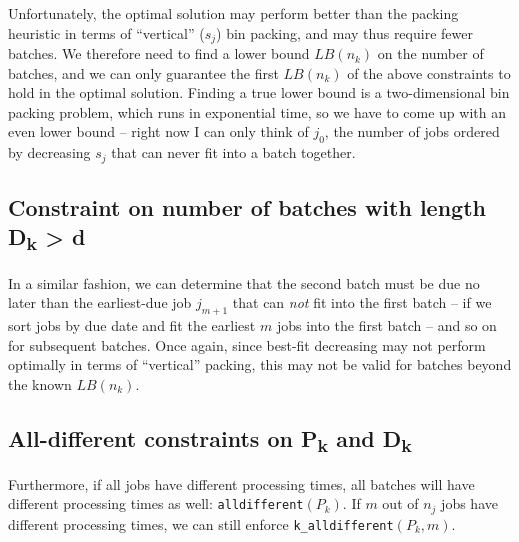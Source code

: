 Unfortunately, the optimal solution may perform better than the packing heuristic in
terms of ``vertical'' ($s_j$) bin packing, and may thus require fewer batches.
We therefore need to find a lower bound $LB(n_k)$ on the number of batches, and
we can only guarantee the first $LB(n_k)$ of the above constraints to hold in
the optimal solution. Finding a true lower bound is a two-dimensional bin
packing problem, which runs in exponential time, so we
have to come up with an even lower bound -- right now I can only think of $j_0$,
the number of jobs ordered by decreasing $s_j$ that can never fit into a batch
together.

\subsection[Constraint on the number of batches with due date $D_k >
d$]{Constraint on number of batches with length {\sansitalicfont
D\textsubscript{k}} > {\sansitalicfont d}}

In a similar fashion, we can determine that the second batch must be due no
later than the earliest-due job $j_{m+1}$ that can \textit{not} fit into the first
batch -- if we sort jobs by due date and fit the earliest $m$ jobs into the first
batch -- and so on for subsequent batches. Once again, since best-fit decreasing
may not perform optimally in terms of ``vertical'' packing, this may not be
valid for batches beyond the known $LB(n_k)$.

\subsection[All-different constraints on $P_k$ and $D_k$]{All-different
constraints on {\sansitalicfont P\textsubscript{k}} and {\sansitalicfont
D\textsubscript{k}}}

Furthermore, if all jobs have different processing times, all batches will have different
processing times as well: \texttt{alldifferent}$(P_k)$. If $m$ out of $n_j$ jobs
have different processing times, we can still enforce
\texttt{k\_alldifferent}$(P_k, m)$. 

